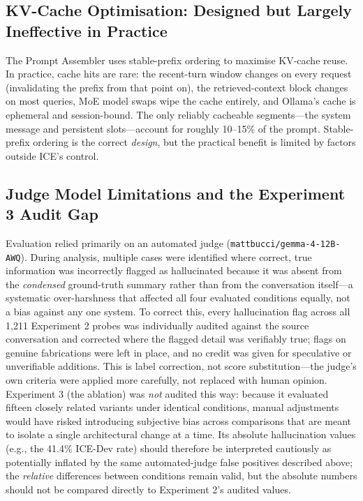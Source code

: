 \documentclass[10pt]{article}
\begin{document}
\subsection{KV-Cache Optimisation: Designed but Largely Ineffective in Practice}
The Prompt Assembler uses stable-prefix ordering to maximise KV-cache reuse. In practice, cache hits are rare: the recent-turn window changes on every request (invalidating the prefix from that point on), the retrieved-context block changes on most queries, MoE model swaps wipe the cache entirely, and Ollama's cache is ephemeral and session-bound. The only reliably cacheable segments---the system message and persistent slots---account for roughly 10--15\% of the prompt. Stable-prefix ordering is the correct \emph{design}, but the practical benefit is limited by factors outside ICE's control.

\subsection{Judge Model Limitations and the Experiment 3 Audit Gap}
Evaluation relied primarily on an automated judge (\texttt{mattbucci/gemma-4-12B-AWQ}). During analysis, multiple cases were identified where correct, true information was incorrectly flagged as hallucinated because it was absent from the \emph{condensed} ground-truth summary rather than from the conversation itself---a systematic over-harshness that affected all four evaluated conditions equally, not a bias against any one system. To correct this, every hallucination flag across all 1{,}211 Experiment 2 probes was individually audited against the source conversation and corrected where the flagged detail was verifiably true; flags on genuine fabrications were left in place, and no credit was given for speculative or unverifiable additions. This is label correction, not score substitution---the judge's own criteria were applied more carefully, not replaced with human opinion. Experiment 3 (the ablation) was \emph{not} audited this way: because it evaluated fifteen closely related variants under identical conditions, manual adjustments would have risked introducing subjective bias across comparisons that are meant to isolate a single architectural change at a time. Its absolute hallucination values (e.g., the 41.4\% ICE-Dev rate) should therefore be interpreted cautiously as potentially inflated by the same automated-judge false positives described above; the \emph{relative} differences between conditions remain valid, but the absolute numbers should not be compared directly to Experiment 2's audited values.
\end{document}
